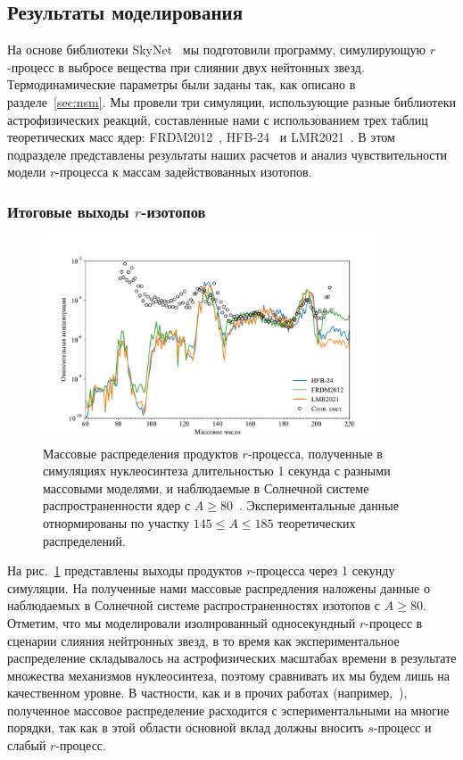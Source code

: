\subsection{Результаты моделирования}
На основе библиотеки SkyNet~\cite{lippuner2017} мы подготовили программу, симулирующую $r$-процесс в выбросе вещества при слиянии двух нейтонных звезд. Термодинамические параметры были заданы так, как описано в разделе~\ref{sec:nsm}. Мы провели три симуляции, использующие разные библиотеки астрофизических реакций, составленные нами с использованием трех таблиц теоретических масс ядер: FRDM2012~\cite{moller2016}, HFB-24~\cite{goriely2013} и LMR2021~\cite{vladimirova2022}. В этом подразделе представлены результаты наших расчетов и анализ чувствительности модели $r$-процесса к массам задействованных изотопов.

\subsubsection{Итоговые выходы $r$-изотопов}

\begin{figure}
\centering
\includegraphics[width=0.9\textwidth]{pics/distr.pdf}
\caption{Массовые распределения продуктов $r$-процесса, полученные в симуляциях нуклеосинтеза длительностью 1 секунда с разными массовыми моделями, и наблюдаемые в Солнечной системе распространенности ядер с $A \geq 80$~\cite{lodders2003}. Экспериментальные данные отнормированы по участку $145 \leq A \leq 185$ теоретических распределений.}
\label{fig:distr}
\end{figure}

На рис.~\ref{fig:distr} представлены выходы продуктов $r$-процесса через 1 секунду симуляции. На полученные нами массовые распредления наложены данные о наблюдаемых в Солнечной системе распространенностях изотопов с $A \geq 80$. Отметим, что мы моделировали изолированный односекундный $r$-процесс в сценарии слияния нейтронных звезд, в то время как экспериментальное распределение складывалось на астрофизических масштабах времени в результате множества механизмов нуклеосинтеза, поэтому сравнивать их мы будем лишь на качественном уровне. В частности, как и в прочих работах (например,~\cite{goriely2011}), полученное массовое распределение расходится с эспериментальными на многие порядки, так как в этой области основной вклад должны вносить $s$-процесс и слабый $r$-процесс.

